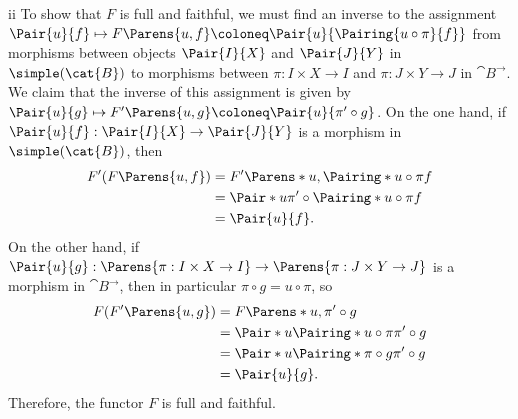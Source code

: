 \begin{partsolution}{ii}
To show that \(F\) is full and faithful, we must find an inverse to the assignment \(\Pair{u}{f} \mapsto F\Parens{u, f} \coloneq \Pair{u}{\Pairing{u\circ\pi}{f}}\) from morphisms between objects \(\Pair{I}{X}\) and \(\Pair{J}{Y}\) in \(\simple(\cat{B})\) to morphisms between \(\pi : I \times X \to I\) and \(\pi : J \times Y \to J\) in \(\cat{B}^\rightarrow\).
We claim that the inverse of this assignment is given by \(\Pair{u}{g} \mapsto F^\prime\Parens{u, g} \coloneq \Pair{u}{\pi^\prime \circ g}\).
On the one hand, if \(\Pair{u}{f} : \Pair{I}{X} \to \Pair{J}{Y}\) is a morphism in \(\simple(\cat{B})\), then
\begin{align*}
F^\prime(F\Parens{u, f})
&= F^\prime\Parens*{u, \Pairing*{u\circ\pi}{f}} \\
&= \Pair*{u}{\pi^\prime \circ \Pairing*{u\circ\pi}{f}} \\
&= \Pair{u}{f}.
\end{align*}
On the other hand, if \(\Pair{u}{g} : \Parens{\pi : I \times X \to I} \to \Parens{\pi : J \times Y \to J}\) is a morphism in \(\cat{B}^\rightarrow\), then in particular \(\pi \circ g = u \circ \pi\), so
\begin{align*}
F(F^\prime\Parens{u, g})
&= F\Parens*{u, \pi^\prime \circ g} \\
&= \Pair*{u}{\Pairing*{u\circ\pi}{\pi^\prime \circ g}} \\
&= \Pair*{u}{\Pairing*{\pi \circ g}{\pi^\prime \circ g}} \\
&= \Pair{u}{g}.
\end{align*}
Therefore, the functor \(F\) is full and faithful.


\end{partsolution}
